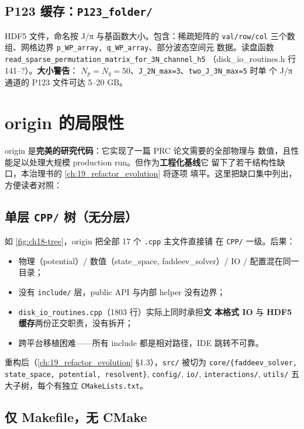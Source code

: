 \subsection{P123 缓存：\texttt{P123\_folder/}}

HDF5 文件，命名按 J/π 与基函数大小。包含：稀疏矩阵的 \texttt{val/row/col}
三个数组、网格边界 \texttt{p\_WP\_array, q\_WP\_array}、部分波态空间元
数据。读盘函数 \texttt{read\_sparse\_permutation\_matrix\_for\_3N\_channel\_h5}
（disk\_io\_routines.h 行 141--?）。\textbf{大小警告}：
$N_p = N_q = 50$、\texttt{J\_2N\_max=3}、\texttt{two\_J\_3N\_max=5} 时单
个 J/π 通道的 P123 文件可达 5--20 GB。

\section{origin 的局限性}
\label{sec:ch18-limitations}

origin 是\textbf{完美的研究代码}：它实现了一篇 PRC 论文需要的全部物理与
数值，且性能足以处理大规模 production run。但作为\textbf{工程化基线}它
留下了若干结构性缺口，本治理书的 \cref{ch:19_refactor_evolution} 将逐项
填平。这里把缺口集中列出，方便读者对照：

\subsection{单层 \texttt{CPP/} 树（无分层）}
\label{subsec:ch18-flat-tree}

如 \cref{fig:ch18-tree}，origin 把全部 17 个 \texttt{.cpp} 主文件直接铺
在 \texttt{CPP/} 一级。后果：
\begin{itemize}
\item 物理（potential）/ 数值（state\_space, faddeev\_solver）/ IO /
      配置混在同一目录；
\item 没有 \texttt{include/} 层，public API 与内部 helper 没有边界；
\item \texttt{disk\_io\_routines.cpp}（1803 行）实际上同时承担\textbf{文
      本格式 IO} 与 \textbf{HDF5 缓存}两份正交职责，没有拆开；
\item 跨平台移植困难——所有 include 都是相对路径，IDE 跳转不可靠。
\end{itemize}
重构后（\cref{ch:19_refactor_evolution} §1.3），\texttt{src/} 被切为
\texttt{core/\{faddeev\_solver, state\_space, potential, resolvent\}},
\texttt{config/}, \texttt{io/}, \texttt{interactions/}, \texttt{utils/}
五大子树，每个有独立 \texttt{CMakeLists.txt}。

\subsection{仅 Makefile，无 CMake}

